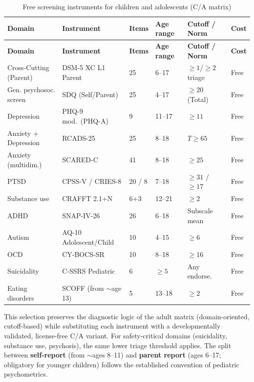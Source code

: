 \documentclass[11pt,a4paper]{article}
\begin{document}
\footnotesize
\begin{longtable}{@{}L{2.4cm}L{2.4cm}L{0.9cm}L{1.5cm}L{2.0cm}L{1.5cm}@{}}
\caption{Free screening instruments for children and adolescents (C/A matrix)} \label{tab:instrumente_ca} \\
\toprule
\textbf{Domain} & \textbf{Instrument} & \textbf{Items} & \textbf{Age range} & \textbf{Cutoff / Norm} & \textbf{Cost} \\
\midrule
\endfirsthead
\toprule
\textbf{Domain} & \textbf{Instrument} & \textbf{Items} & \textbf{Age range} & \textbf{Cutoff / Norm} & \textbf{Cost} \\
\midrule
\endhead
Cross-Cutting (Parent) & DSM-5 XC L1 Parent & 25 & 6--17 & $\geq 1$/$\geq 2$ triage & Free \\
\addlinespace
Gen. psychosoc. screen & SDQ (Self/Parent) & 25 & 4--17 & $\geq 20$ (Total) & Free \\
\addlinespace
Depression & PHQ-9 mod.\ (PHQ-A) & 9 & 11--17 & $\geq 11$ & Free \\
\addlinespace
Anxiety + Depression & RCADS-25 & 25 & 8--18 & $T \geq 65$ & Free \\
\addlinespace
Anxiety (multidim.) & SCARED-C & 41 & 8--18 & $\geq 25$ & Free \\
\addlinespace
PTSD & CPSS-V / CRIES-8 & 20 / 8 & 7--18 & $\geq 31$ / $\geq 17$ & Free \\
\addlinespace
Substance use & CRAFFT 2.1+N & 6+3 & 12--21 & $\geq 2$ & Free \\
\addlinespace
ADHD & SNAP-IV-26 & 26 & 6--18 & Subscale mean & Free \\
\addlinespace
Autism & AQ-10 Adolescent/Child & 10 & 4--15 & $\geq 6$ & Free \\
\addlinespace
OCD & CY-BOCS-SR & 10 & 8--18 & $\geq 16$ & Free \\
\addlinespace
Suicidality & C-SSRS Pediatric & 6 & $\geq 5$ & Any endorse.\ & Free \\
\addlinespace
Eating disorders & SCOFF (from $\sim$age 13) & 5 & 13--18 & $\geq 2$ & Free \\
\bottomrule
\end{longtable}
\normalsize

This selection preserves the diagnostic logic of the adult matrix (domain-oriented, cutoff-based) while substituting each instrument with a developmentally validated, license-free C/A variant. For safety-critical domains (suicidality, substance use, psychosis), the same lower triage threshold applies. The split between \textbf{self-report} (from $\sim$ages 8--11) and \textbf{parent report} (ages 6--17; obligatory for younger children) follows the established convention of pediatric psychometrics.
\end{document}
